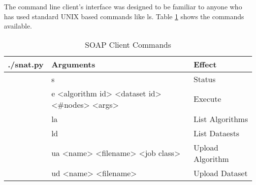 The command line client's interface was designed to be familiar to anyone who has used standard UNIX based commands like ls. Table \ref{tab:soapclient} shows the commands available.

\begin{table}[htbp]%
\begin{tabular}{l|l|l}
./snat.py & Arguments & Effect \\
\hline
 & s & Status \\
 & e <algorithm id> <dataset id> <\#nodes> <args> & Execute \\
 & la & List Algorithms \\
 & ld & List Dataests \\
 & ua <name> <filename> <job class> & Upload Algorithm \\
 & ud <name> <filename> & Upload Dataset \\
\end{tabular}
\caption{SOAP Client Commands}
\label{tab:soapclient}
\end{table}
